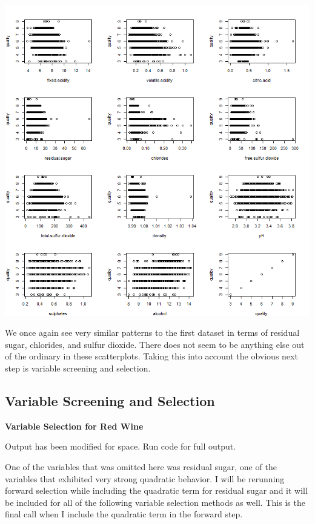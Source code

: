 \documentclass{article}
\begin{document}
	\includegraphics[scale=0.7]{../plots/Wine/white_wine_Rscatter.png}
	
	We once again see very similar patterns to the first dataset in terms of residual sugar, chlorides, and
	sulfur dioxide. There does not seem to be anything else out of the ordinary in these scatterplots. Taking 
	this into account the obvious next step is variable screening and selection. 

	\subsection{Variable Screening and Selection}
	

	\textbf{Variable Selection for Red Wine} 
	
	
		Output has been modified for space. Run code for full output. 
	

	One of the variables that was omitted here was residual sugar, one of the variables that exhibited very strong 
	quadratic behavior. I will be rerunning forward selection while including the quadratic term for residual sugar 
	and it will be included for all of the following variable selection methods as well. This is the final call when 
	I include the quadratic term in the forward step. 
	
\end{document}
